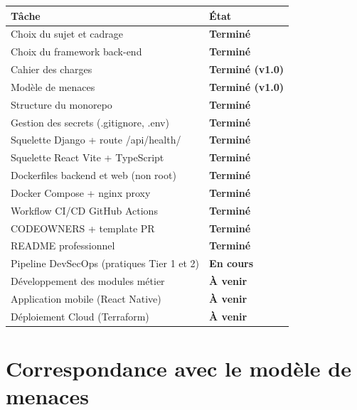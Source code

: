 \documentclass[11pt,a4paper]{article}
\begin{document}
\begin{center}
\renewcommand{\arraystretch}{1.4}
\begin{tabular}{|p{7.5cm}|p{4cm}|}
  \hline
  \textbf{Tâche} & \textbf{État} \\
  \hline
  Choix du sujet et cadrage & \textcolor{faible}{\textbf{Terminé}} \\
  \hline
  Choix du framework back-end & \textcolor{faible}{\textbf{Terminé}} \\
  \hline
  Cahier des charges & \textcolor{faible}{\textbf{Terminé (v1.0)}} \\
  \hline
  Modèle de menaces & \textcolor{faible}{\textbf{Terminé (v1.0)}} \\
  \hline
  Structure du monorepo & \textcolor{faible}{\textbf{Terminé}} \\
  \hline
  Gestion des secrets (.gitignore, .env) & \textcolor{faible}{\textbf{Terminé}} \\
  \hline
  Squelette Django + route /api/health/ & \textcolor{faible}{\textbf{Terminé}} \\
  \hline
  Squelette React Vite + TypeScript & \textcolor{faible}{\textbf{Terminé}} \\
  \hline
  Dockerfiles backend et web (non root) & \textcolor{faible}{\textbf{Terminé}} \\
  \hline
  Docker Compose + nginx proxy & \textcolor{faible}{\textbf{Terminé}} \\
  \hline
  Workflow CI/CD GitHub Actions & \textcolor{faible}{\textbf{Terminé}} \\
  \hline
  CODEOWNERS + template PR & \textcolor{faible}{\textbf{Terminé}} \\
  \hline
  README professionnel & \textcolor{faible}{\textbf{Terminé}} \\
  \hline
  Pipeline DevSecOps (pratiques Tier 1 et 2) & \textcolor{eleve}{\textbf{En cours}} \\
  \hline
  Développement des modules métier & \textcolor{critiq}{\textbf{À venir}} \\
  \hline
  Application mobile (React Native) & \textcolor{critiq}{\textbf{À venir}} \\
  \hline
  Déploiement Cloud (Terraform) & \textcolor{critiq}{\textbf{À venir}} \\
  \hline
\end{tabular}
\end{center}

\section{Correspondance avec le modèle de menaces}
\end{document}
